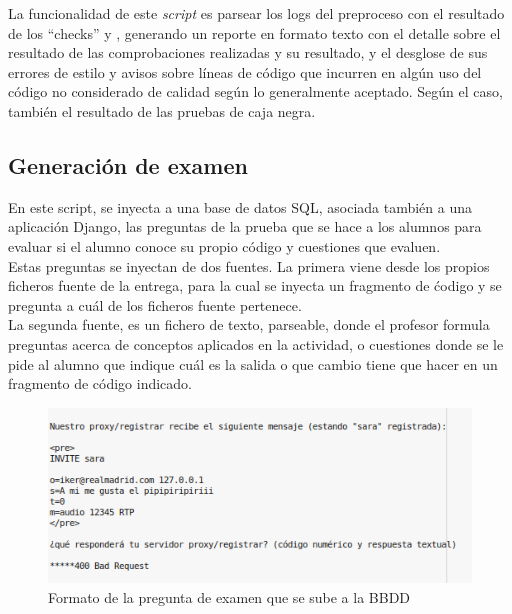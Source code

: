 La funcionalidad de este \textit{script} es parsear los logs del preproceso con el resultado de los ``checks'' y , generando un reporte en formato texto con el detalle sobre el resultado de las comprobaciones realizadas y su resultado, y el desglose de sus errores de estilo y avisos sobre líneas de código que incurren en algún uso del código no considerado de calidad según lo generalmente aceptado. Según el caso, también el resultado de las pruebas de caja negra.


\subsection{Generación de examen}
\label{sec:gen_exam}

En este script, se inyecta a una base de datos SQL, asociada también a una aplicación Django, las preguntas de la prueba que se hace a los alumnos para evaluar si el alumno conoce su propio código y cuestiones que evaluen.\\


Estas preguntas se inyectan de dos fuentes. La primera viene desde los propios ficheros fuente de la entrega, para la cual se inyecta un fragmento de ćodigo y se pregunta a cuál de los ficheros fuente pertenece.\\


La segunda fuente, es un fichero de texto, parseable, donde el profesor formula preguntas acerca de conceptos aplicados en la actividad, o cuestiones donde se le pide al alumno que indique cuál es la salida o que cambio tiene que hacer en un fragmento de código indicado.\\

\begin{figure}[H]
   \centering
   \includegraphics[width=16cm]{img/Selection_020_expregunta}
   \caption{Formato de la pregunta de examen que se sube a la BBDD}
   \label{figura:formato_examen}
\end{figure}



